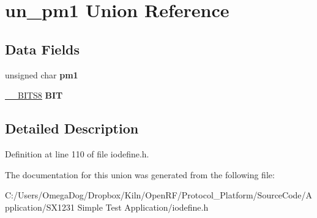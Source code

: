 \hypertarget{unionun__pm1}{\section{un\-\_\-pm1 Union Reference}
\label{unionun__pm1}
}
\subsection*{Data Fields}
\begin{DoxyCompactItemize}
\item 
\hypertarget{unionun__pm1_ad42fd462aa7475894d76920dd9b0cf25}{unsigned char {\bfseries pm1}}\label{unionun__pm1_ad42fd462aa7475894d76920dd9b0cf25}

\item 
\hypertarget{unionun__pm1_ab8e54a3c2adb0148fe50bada54bc0506}{\hyperlink{struct_____b_i_t_s8}{\-\_\-\-\_\-\-B\-I\-T\-S8} {\bfseries B\-I\-T}}\label{unionun__pm1_ab8e54a3c2adb0148fe50bada54bc0506}

\end{DoxyCompactItemize}


\subsection{Detailed Description}


Definition at line 110 of file iodefine.\-h.



The documentation for this union was generated from the following file\-:\begin{DoxyCompactItemize}
\item 
C\-:/\-Users/\-Omega\-Dog/\-Dropbox/\-Kiln/\-Open\-R\-F/\-Protocol\-\_\-\-Platform/\-Source\-Code/\-Application/\-S\-X1231 Simple Test Application/iodefine.\-h\end{DoxyCompactItemize}
